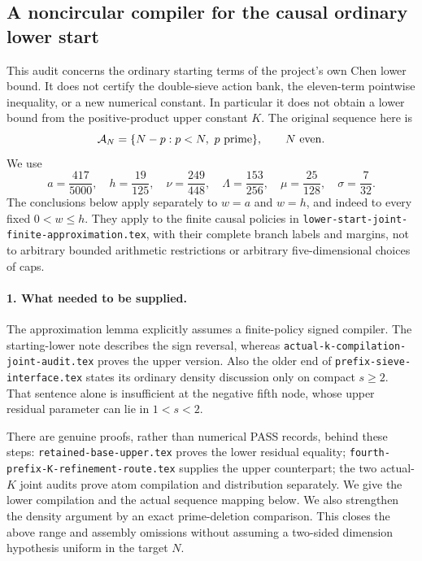 \subsection{A noncircular compiler for the causal ordinary lower start}
\label{sec:own-lower-compiler-chain-audit-20261009}

This audit concerns the ordinary starting terms of the project's own
Chen lower bound. It does not certify the double-sieve action bank, the
eleven-term pointwise inequality, or a new numerical constant. In
particular it does not obtain a lower bound from the positive-product
upper constant \(K\). The original sequence here is
\[
 {\cal A}_N=\{N-p:p<N,\ p\ {\rm prime}\},\qquad N\ {\rm even}.
\]
We use
\[
 a=\frac{417}{5000},\quad h=\frac{19}{125},\quad
 \nu=\frac{249}{448},\quad \Lambda=\frac{153}{256},\quad
 \mu=\frac{25}{128},\quad \sigma=\frac7{32}.
\]
The conclusions below apply separately to \(w=a\) and \(w=h\), and
indeed to every fixed \(0<w\le h\). They apply to the finite causal
policies in \texttt{lower-start-joint-finite-approximation.tex}, with
their complete branch labels and margins, not to arbitrary bounded
arithmetic restrictions or arbitrary five-dimensional choices of caps.

\paragraph{1. What needed to be supplied.}
The approximation lemma explicitly assumes a finite-policy signed
compiler. The starting-lower note describes the sign reversal, whereas
\texttt{actual-k-compilation-joint-audit.tex} proves the upper version.
Also the older end of \texttt{prefix-sieve-interface.tex} states its
ordinary density discussion only on compact \(s\ge2\). That sentence
alone is insufficient at the negative fifth node, whose upper residual
parameter can lie in \(1<s<2\).

There are genuine proofs, rather than numerical PASS records, behind
these steps: \texttt{retained-base-upper.tex} proves the lower residual
equality; \texttt{fourth-prefix-K-refinement-route.tex} supplies the
upper counterpart; the two actual-\(K\) joint audits prove atom
compilation and distribution separately. We give the lower compilation
and the actual sequence mapping below. We also strengthen the density
argument by an exact prime-deletion comparison. This closes the above
range and assembly omissions without assuming a two-sided dimension
hypothesis uniform in the target \(N\).


